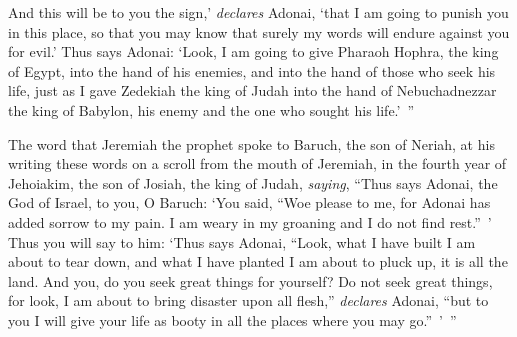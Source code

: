 \begin{biblechapter}
\verse And this will be to you the sign,’ \textit{declares} Adonai, ‘that I am going to punish you in this place, so that you may know that surely my words will endure against you for evil.’
\verse Thus says Adonai: ‘Look, I am going to give Pharaoh Hophra, the king of Egypt, into the hand of his enemies, and into the hand of those who seek his life, just as I gave Zedekiah the king of Judah into the hand of Nebuchadnezzar the king of Babylon, his enemy and the one who sought his life.’ ”
\end{biblechapter}

\begin{biblechapter} %
 The word that Jeremiah the prophet spoke to Baruch, the son of Neriah, at his writing these words on a scroll from the mouth of Jeremiah, in the fourth year of Jehoiakim, the son of Josiah, the king of Judah, \textit{saying},
\verse “Thus says Adonai, the God of Israel, to you, O Baruch:
\verse ‘You said, “Woe please to me, for Adonai has added sorrow to my pain. I am weary in my groaning and I do not find rest.” ’
\verse Thus you will say to him: ‘Thus says Adonai, “Look, what I have built I am about to tear down, and what I have planted I am about to pluck up, it is all the land.
\verse And you, do you seek great things for yourself? Do not seek great things, for look, I am about to bring disaster upon all flesh,” \textit{declares} Adonai, “but to you I will give your life as booty in all the places where you may go.” ’ ”
\end{biblechapter}

